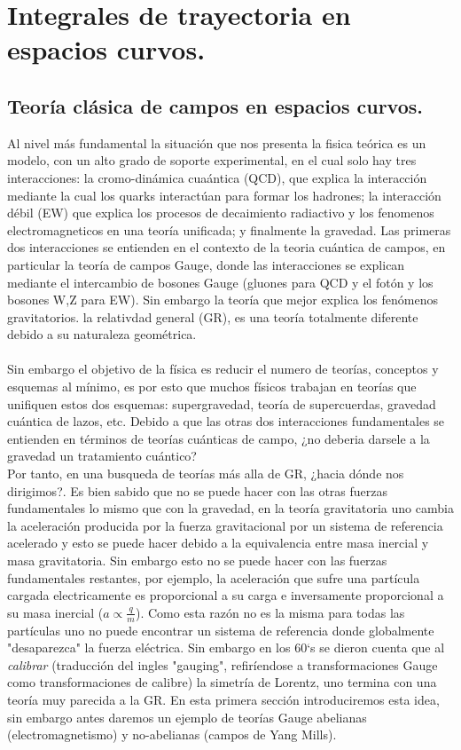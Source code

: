 \chapter{Integrales de trayectoria en espacios curvos.}


	   	
\section{Teoría clásica de campos en espacios curvos.}
Al nivel más fundamental la situación que nos presenta la fisica teórica es un modelo, con un alto grado de soporte experimental, en el cual solo hay tres interacciones: la cromo-dinámica cuaántica (QCD), que explica la interacción mediante la cual los quarks interactúan para formar los hadrones; la interacción débil (EW) que explica los procesos de decaimiento radiactivo y los fenomenos electromagneticos en una teoría unificada; y finalmente la gravedad. Las primeras dos interacciones se entienden en el contexto de la teoria cuántica de campos, en particular la teoría de campos Gauge, donde las interacciones se explican mediante el intercambio de bosones Gauge (gluones para QCD y el fotón y los bosones W,Z para EW). Sin embargo la teoría que mejor explica los fenómenos gravitatorios. la relativdad general (GR), es una teoría totalmente diferente debido a su naturaleza geométrica.
\\
\\
Sin embargo el objetivo de la física es reducir el numero de teorías, conceptos y esquemas al mínimo, es por esto que muchos físicos trabajan en teorías que unifiquen estos dos esquemas: supergravedad, teoría de supercuerdas, gravedad cuántica de lazos, etc. Debido a que las otras dos interacciones fundamentales se entienden en términos de teorías cuánticas de campo, ¿no deberia darsele a la gravedad un tratamiento cuántico?
\\
Por tanto, en una busqueda de teorías más alla de GR, ¿hacia dónde nos dirigimos?. Es bien sabido que no se puede hacer con las otras fuerzas fundamentales lo mismo que con la gravedad, en la teoría gravitatoria uno cambia la aceleración producida por la fuerza gravitacional por un sistema de referencia acelerado y esto se puede hacer debido a la equivalencia entre masa inercial y masa gravitatoria. Sin embargo esto no se puede hacer con las fuerzas fundamentales restantes, por ejemplo, la aceleración que sufre una partícula cargada electricamente es proporcional a su carga e inversamente proporcional a su masa inercial ($a\propto \frac{q}{m}$). Como esta razón no es la misma para todas las partículas uno no puede encontrar un sistema de referencia donde globalmente "desaparezca" la fuerza eléctrica. Sin embargo en los 60`s se dieron cuenta que al \textit{calibrar} (traducción del ingles "gauging", refiríendose a transformaciones Gauge como transformaciones de calibre) la simetría de Lorentz, uno termina con una teoría muy parecida a la GR. En esta primera sección introduciremos esta idea, sin embargo antes daremos un ejemplo de teorías Gauge abelianas (electromagnetismo) y no-abelianas (campos de Yang Mills).
